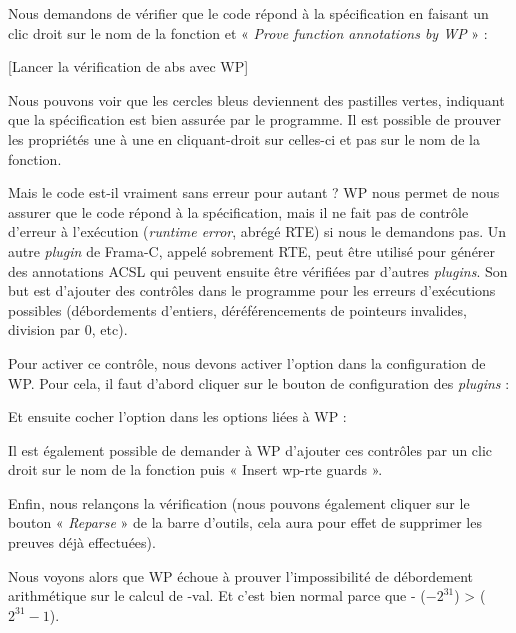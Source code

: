 Nous demandons de vérifier que le code répond à la spécification en faisant 
un clic droit sur le nom de la fonction et « \textit{Prove function annotations by WP} » :



[Lancer la vérification de abs avec WP]


Nous pouvons voir que les cercles bleus deviennent des pastilles vertes, 
indiquant que la spécification est bien assurée par le programme. Il est 
possible de prouver les propriétés une à une en cliquant-droit sur celles-ci 
et pas sur le nom de la fonction.



Mais le code est-il vraiment sans erreur pour autant ? WP nous permet de nous 
assurer que le code répond à la spécification, mais il ne fait pas de contrôle 
d'erreur à l'exécution (\textit{runtime error}, abrégé RTE) si nous le demandons
pas. Un autre \textit{plugin} de Frama-C, appelé sobrement RTE, peut être
utilisé pour générer des annotations ACSL qui peuvent ensuite être vérifiées par
d'autres \textit{plugins}.
Son but est
d'ajouter des contrôles dans le programme pour les erreurs d'exécutions 
possibles (débordements d'entiers, déréférencements de pointeurs invalides, 
division par 0, etc).



Pour activer ce contrôle, nous devons activer l'option dans la configuration
de WP. Pour cela, il faut d'abord cliquer sur le bouton de configuration des
\textit{plugins} :




Et ensuite cocher l'option  dans les options liées à WP :




Il est également possible de demander à WP d'ajouter ces 
contrôles par un clic droit sur le nom de la fonction puis
« Insert wp-rte guards ».


Enfin, nous relançons la vérification (nous pouvons également cliquer sur le 
bouton « \textit{Reparse} » de la barre d'outils, cela aura pour effet de supprimer les
preuves déjà effectuées).



Nous voyons alors que WP échoue à prouver  l'impossibilité de 
débordement arithmétique sur le calcul de -val. Et c'est bien normal parce 
que - ($-2^{31}$) >  ($2^{31}-1$).



